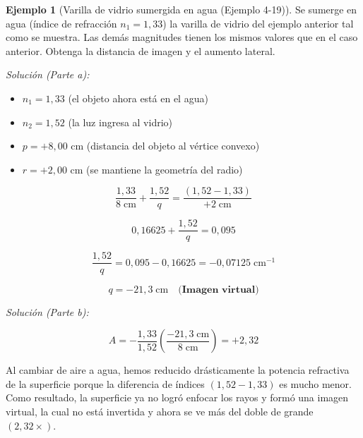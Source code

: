 \documentclass[12pt, a4paper]{article}
\theoremstyle{definition}
\newtheorem{ejemplo}{Ejemplo}[section]
\begin{document}
\begin{ejemplo}[Varilla de vidrio sumergida en agua (Ejemplo 4-19)]
Se sumerge en agua (índice de refracción \(n_1 = 1{,}33\)) la varilla de vidrio del
ejemplo anterior tal como se muestra. Las demás magnitudes tienen los mismos valores que
en el caso anterior. Obtenga la distancia de imagen y el aumento lateral.

\textit{Solución (Parte a):}

\begin{itemize}
  \item \(n_1 = 1{,}33\) (el objeto ahora está en el agua)
  \item \(n_2 = 1{,}52\) (la luz ingresa al vidrio)
  \item \(p = +8{,}00\) cm (distancia del objeto al vértice convexo)
  \item \(r = +2{,}00\) cm (se mantiene la geometría del radio)
\end{itemize}

\[
  \frac{1{,}33}{8\;\text{cm}} + \frac{1{,}52}{q} = \frac{(1{,}52 - 1{,}33)}{+2\;\text{cm}}
\]

\[
  0{,}16625 + \frac{1{,}52}{q} = 0{,}095
\]

\[
  \frac{1{,}52}{q} = 0{,}095 - 0{,}16625 = -0{,}07125\;\text{cm}^{-1}
\]

\[
  q = -21{,}3\;\text{cm} \quad \textbf{(Imagen virtual)}
\]

\textit{Solución (Parte b):}

\[
  A = -\frac{1{,}33}{1{,}52}\left(\frac{-21{,}3\;\text{cm}}{8\;\text{cm}}\right) = +2{,}32
\]

Al cambiar de aire a agua, hemos reducido drásticamente la potencia refractiva de la
superficie porque la diferencia de índices \((1{,}52 - 1{,}33)\) es mucho menor. Como
resultado, la superficie ya no logró enfocar los rayos y formó una imagen virtual, la cual
no está invertida y ahora se ve más del doble de grande \((2{,}32\times)\).
\end{ejemplo}
\end{document}
